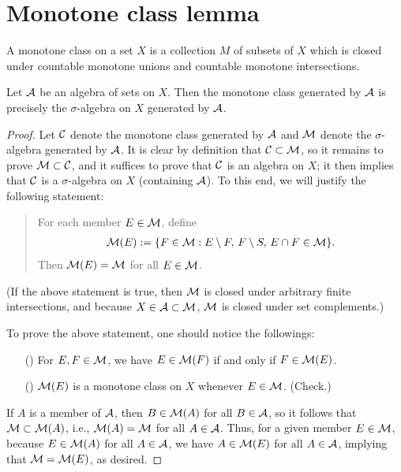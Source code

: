 \section{Monotone class lemma}

\begin{defi}
    A monotone class on a set $X$ is a collection $M$ of subsets of $X$ which is closed under countable monotone unions and countable monotone intersections.
\end{defi}

\begin{thm}
    Let ${\mathcal{A}}$ be an algebra of sets on $X$.
    Then the monotone class generated by ${\mathcal{A}}$ is precisely the $\sigma$-algebra on $X$ generated by ${\mathcal{A}}$.
\end{thm}
\begin{proof}
    Let ${\mathcal{C}}$ denote the monotone class generated by ${\mathcal{A}}$ and ${\mathcal{M}}$ denote the $\sigma$-algebra generated by ${\mathcal{A}}$.
    It is clear by definition that ${\mathcal{C}}\subset{\mathcal{M}}$, so it remains to prove ${\mathcal{M}}\subset{\mathcal{C}}$, and it suffices to prove that ${\mathcal{C}}$ is an algebra on $X$; it then implies that ${\mathcal{C}}$ is a $\sigma$-algebra on $X$ (containing ${\mathcal{A}}$).
    To this end, we will justify the following statement:
    \begin{quotation}
        For each member $E\in{\mathcal{M}}$, define
        \begin{align*}
            {\mathcal{M}}(E):=\{F\in{\mathcal{M}}: E\setminus F,\, F\setminus S,\, E\cap F\in{\mathcal{M}} \}.
        \end{align*}
        Then ${\mathcal{M}}(E)={\mathcal{M}}$ for all $E\in{\mathcal{M}}$.
    \end{quotation}
    (If the above statement is true, then ${\mathcal{M}}$ is closed under arbitrary finite intersections, and because $X\in{\mathcal{A}}\subset{\mathcal{M}}$, ${\mathcal{M}}$ is closed under set complements.)

    To prove the above statement, one should notice the followings:
    \begin{enumerate}
        \item[(\romannumeral 1)]
        {
            For $E, F\in{\mathcal{M}}$, we have $E\in{\mathcal{M}}(F)$ if and only if $F\in{\mathcal{M}}(E)$.
        }
        \item[(\romannumeral 2)]
        {
            ${\mathcal{M}}(E)$ is a monotone class on $X$ whenever $E\in{\mathcal{M}}$. \color{brown}(Check.)\color{black}
        }
    \end{enumerate}
    If $A$ is a member of ${\mathcal{A}}$, then $B\in{\mathcal{M}}(A)$ for all $B\in{\mathcal{A}}$, so it follows that ${\mathcal{M}}\subset{\mathcal{M}}(A)$, i.e., ${\mathcal{M}}(A)={\mathcal{M}}$ for all $A\in{\mathcal{A}}$.
    Thus, for a given member $E\in{\mathcal{M}}$, because $E\in{\mathcal{M}}(A)$ for all $A\in{\mathcal{A}}$, we have $A\in{\mathcal{M}}(E)$ for all $A\in{\mathcal{A}}$, implying that ${\mathcal{M}}={\mathcal{M}}(E)$, as desired.
\end{proof}
